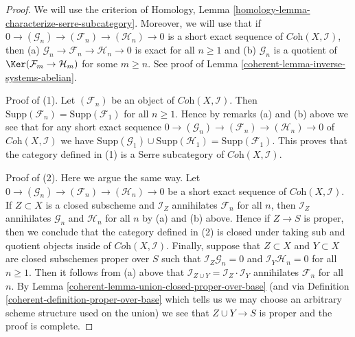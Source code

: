 \begin{proof}

We will use the criterion of
Homology, Lemma \ref{homology-lemma-characterize-serre-subcategory}.
Moreover, we will use that if
$0 \to (\mathcal{G}_n) \to (\mathcal{F}_n) \to (\mathcal{H}_n) \to 0$
is a short exact sequence of $\textit{Coh}(X, \mathcal{I})$, then
(a) $\mathcal{G}_n \to \mathcal{F}_n \to \mathcal{H}_n \to 0$
is exact for all $n \geq 1$ and
(b) $\mathcal{G}_n$ is a quotient of $\Ker(\mathcal{F}_m \to \mathcal{H}_m)$
for some $m \geq n$. See proof of Lemma \ref{coherent-lemma-inverse-systems-abelian}.

\medskip\noindent
Proof of (1). Let $(\mathcal{F}_n)$ be an object of
$\textit{Coh}(X, \mathcal{I})$. Then
$\text{Supp}(\mathcal{F}_n) = \text{Supp}(\mathcal{F}_1)$ for all $n \geq 1$.
Hence by remarks (a) and (b) above we see that
for any short exact sequence
$0 \to (\mathcal{G}_n) \to (\mathcal{F}_n) \to (\mathcal{H}_n) \to 0$
of $\textit{Coh}(X, \mathcal{I})$ we have
$\text{Supp}(\mathcal{G}_1) \cup \text{Supp}(\mathcal{H}_1) =
\text{Supp}(\mathcal{F}_1)$.
This proves that the category defined in (1)
is a Serre subcategory of $\textit{Coh}(X, \mathcal{I})$.

\medskip\noindent
Proof of (2). Here we argue the same way. Let
$0 \to (\mathcal{G}_n) \to (\mathcal{F}_n) \to (\mathcal{H}_n) \to 0$
be a short exact sequence of $\textit{Coh}(X, \mathcal{I})$.
If $Z \subset X$ is a closed subscheme and $\mathcal{I}_Z$
annihilates $\mathcal{F}_n$ for all $n$, then
$\mathcal{I}_Z$ annihilates $\mathcal{G}_n$ and $\mathcal{H}_n$
for all $n$ by (a) and (b) above.
Hence if $Z \to S$ is proper, then we conclude that the category
defined in (2) is closed under taking sub and quotient objects
inside of $\textit{Coh}(X, \mathcal{I})$.
Finally, suppose that $Z \subset X$ and $Y \subset X$ are
closed subschemes proper over $S$ such that
$\mathcal{I}_Z \mathcal{G}_n = 0$ and
$\mathcal{I}_Y \mathcal{H}_n = 0$ for all $n \geq 1$.
Then it follows from (a) above that
$\mathcal{I}_{Z \cup Y} = \mathcal{I}_Z \cdot \mathcal{I}_Y$
annihilates $\mathcal{F}_n$ for all $n$.
By Lemma \ref{coherent-lemma-union-closed-proper-over-base}
(and via Definition \ref{coherent-definition-proper-over-base} which
tells us we may choose an arbitrary scheme structure used on the union)
we see that $Z \cup Y \to S$ is proper and the proof is complete.
\end{proof}

